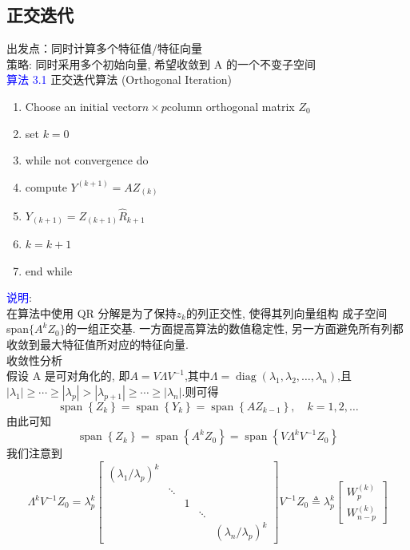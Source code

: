 \documentclass[12pt,a4paper]{article}
\begin{document}
\subsection{正交迭代}
\noindent 出发点：同时计算多个特征值/特征向量\\
策略: 同时采用多个初始向量, 希望收敛到 A 的一个不变子空间\\
\textcolor{blue}{算法 3.1} 正交迭代算法 (Orthogonal Iteration)\\
\begin{enumerate}[1:]
	\item Choose an initial vector$n\times p$column orthogonal matrix $Z_{0}$ 
	\item set $k=0$
	\item while not convergence do
	\item \qquad compute $Y^{(k+1)} = AZ_{(k)}$
	\item \qquad$Y_{(k+1)}=Z_{(k+1)}\hat{R}_{k+1}$
	\item \qquad$k=k+1$
	\item end while
\end{enumerate}
\textcolor{blue}{说明}:\\
在算法中使用 QR 分解是为了保持$z_k$的列正交性, 使得其列向量组构 成子空间 span$\{A^kZ_0\}$的一组正交基. 一方面提高算法的数值稳定性, 另一方面避免所有列都收敛到最大特征值所对应的特征向量.\\
收敛性分析\\
假设 A 是可对角化的, 即$A=V \Lambda V^{-1}$,其中$\Lambda=\operatorname{diag}\left(\lambda_{1}, \lambda_{2}, \ldots, \lambda_{n}\right)$,且$\left|\lambda_{1}\right| \geq \cdots \geq\left|\lambda_{p}\right|>\left|\lambda_{p+1}\right| \geq \cdots \geq\left|\lambda_{n}\right|$.则可得
$$
\operatorname{span}\left\{Z_{k}\right\}=\operatorname{span}\left\{Y_{k}\right\}=\operatorname{span}\left\{A Z_{k-1}\right\}, \quad k=1,2, \ldots
$$
由此可知
$$
\operatorname{span}\left\{Z_{k}\right\}=\operatorname{span}\left\{A^{k} Z_{0}\right\}=\operatorname{span}\left\{V \Lambda^{k} V^{-1} Z_{0}\right\}
$$
我们注意到
$$
\Lambda^{k} V^{-1} Z_{0}=\lambda_{p}^{k}\left[\begin{array}{ccccc}
{\left(\lambda_{1} / \lambda_{p}\right)^{k}} & {} & {} &{}&{}\\ 
{} & {\ddots} & {} & {} &{}\\
{} & {} & {1}& {} & {} \\ 
{} & {} & {} & {\ddots} & {} \\
{} & {} & {} & {} & {\left(\lambda_{n} / \lambda_{p}\right)^{k}}
\end{array}\right]V^{-1} Z_{0} \triangleq \lambda_{p}^{k}\left[\begin{array}{c}
{W_{p}^{(k)}} \\ 
{W_{n-p}^{(k)}}
\end{array}\right]
$$
\end{document}
